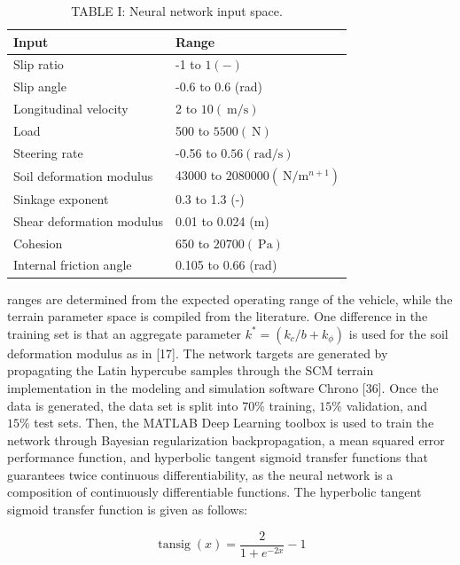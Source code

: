\documentclass[10pt]{article}
\begin{document}
\begin{table}[h]
\begin{center}
\captionsetup{labelformat=empty}
\caption{TABLE I: Neural network input space.}
\begin{tabular}{|l|l|}
\hline
Input & Range \\
\hline
Slip ratio & -1 to $1(-)$ \\
\hline
Slip angle & -0.6 to 0.6 (rad) \\
\hline
Longitudinal velocity & 2 to $10(\mathrm{~m} / \mathrm{s})$ \\
\hline
Load & 500 to $5500(\mathrm{~N})$ \\
\hline
Steering rate & -0.56 to $0.56(\mathrm{rad} / \mathrm{s})$ \\
\hline
Soil deformation modulus & 43000 to $2080000\left(\mathrm{~N} / \mathrm{m}^{n+1}\right)$ \\
\hline
Sinkage exponent & 0.3 to 1.3 (-) \\
\hline
Shear deformation modulus & 0.01 to 0.024 (m) \\
\hline
Cohesion & 650 to $20700(\mathrm{~Pa})$ \\
\hline
Internal friction angle & 0.105 to 0.66 (rad) \\
\hline
\end{tabular}
\end{center}
\end{table}

ranges are determined from the expected operating range of the vehicle, while the terrain parameter space is compiled from the literature. One difference in the training set is that an aggregate parameter $k^{*}=\left(k_{c} / b+k_{\phi}\right)$ is used for the soil deformation modulus as in [17]. The network targets are generated by propagating the Latin hypercube samples through the SCM terrain implementation in the modeling and simulation software Chrono [36]. Once the data is generated, the data set is split into $70 \%$ training, $15 \%$ validation, and $15 \%$ test sets. Then, the MATLAB Deep Learning toolbox is used to train the network through Bayesian regularization backpropagation, a mean squared error performance function, and hyperbolic tangent sigmoid transfer functions that guarantees twice continuous differentiability, as the neural network is a composition of continuously differentiable functions. The hyperbolic tangent sigmoid transfer function is given as follows:


\begin{equation*}
\operatorname{tansig}(x)=\frac{2}{1+e^{-2 x}}-1 \tag{4}
\end{equation*}
\end{document}
